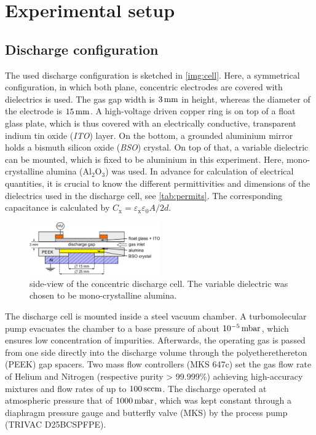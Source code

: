 \documentclass[a4paper,10pt,twoside]{article}
\newcommand{\tenpo}[1]{ 10^{#1}}
\newcommand{\ix}[1]{_\text{#1}}
\newcommand{\tilt}[1]{\textit{#1}}
\begin{document}
	\section{Experimental setup}
	
		\subsection{Discharge configuration}
		
			The used discharge configuration is sketched in \autoref{img:cell}. Here, a symmetrical configuration, in which both plane, concentric electrodes are covered with dielectrics is used. The gas gap width is $\unit[3]{mm}$ in height, whereas the diameter of the electrode is $\unit[15]{mm}$. A high-voltage driven copper ring is on top of a float glass plate, which is thus covered with an electrically conductive, transparent indium tin oxide  (\tilt{ITO}) layer. On the bottom, a grounded aluminium mirror holds a bismuth silicon oxide (\tilt{BSO}) crystal. On top of that, a variable dielectric can be mounted, which is fixed to be aluminium in this experiment. Here, mono-crystalline alumina (Al$_2$O$_3$) was used. In advance for calculation of electrical quantities, it is crucial to know the different permittivities and dimensions of the dielectrics used in the discharge cell, see \autoref{tab:permits}. The corresponding capacitance is calculated by $C\ix{x}=\varepsilon\ix{x}\varepsilon_0 A/2d$.
			
				\begin{figure}[t!]
					\centering
					\includegraphics[width=0.5\textwidth]{figures/setup/discharge_cell.pdf}
					\caption{side-view of the concentric discharge cell. The variable dielectric was chosen to be mono-crystalline alumina.}
					\label{img:cell}
				\end{figure}
			
			The discharge cell is mounted inside a steel vacuum chamber. A turbomolecular pump evacuates the chamber to a base pressure of about $\unit[\tenpo{-5}]{mbar}$, which ensures low concentration of impurities. Afterwards, the operating gas is passed from one side directly into the discharge volume through the polyetherethereton (PEEK) gap spacers. Two mass flow controllers (MKS 647c) set the gas flow rate of Helium and Nitrogen (respective purity > 99.999\%) achieving high-accuracy mixtures and flow rates of up to $\unit[100]{sccm}$. The discharge operated at atmospheric pressure that of $\unit[1000]{mbar}$, which was kept constant through a diaphragm pressure gauge and butterfly valve (MKS) by the process pump (TRIVAC D25BCSPFPE).
				
\end{document}
